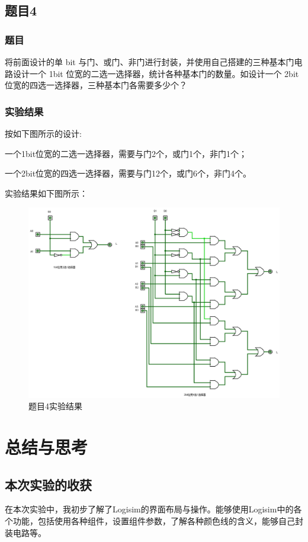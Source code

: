 \documentclass[UTF8]{article}
\begin{document}
	\subsection{题目4}
	\subsubsection{题目}
	将前面设计的单 bit 与门、或门、非门进行封装，并使用自己搭建的三种基本门电路设计一个 1bit 位宽的二选一选择器，统计各种基本门的数量。如设计一个 2bit位宽的四选一选择器，三种基本门各需要多少个？\par
	\subsubsection{实验结果}
	按如下图所示的设计:\par
	一个1bit位宽的二选一选择器，需要与门2个，或门1个，非门1个；\par
	一个2bit位宽的四选一选择器，需要与门12个，或门6个，非门4个。\par
	实验结果如下图所示：
	\begin{figure}[H]
		\centering
		\includegraphics[scale=0.3]{4.png}
		\caption{题目4实验结果}
		\label{4}
	\end{figure}
	
	\section{总结与思考}
	
	\subsection{本次实验的收获}
	在本次实验中，我初步了解了Logisim的界面布局与操作。能够使用Logisim中的各个功能，包括使用各种组件，设置组件参数，了解各种颜色线的含义，能够自己封装电路等。\par
	
\end{document}
